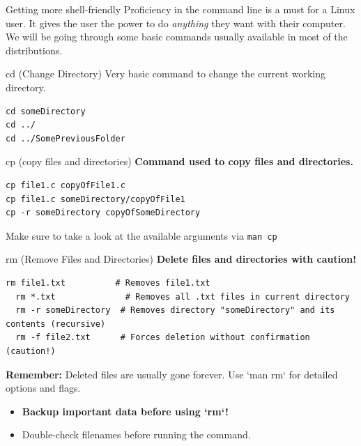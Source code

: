 \documentclass{beamer}
\begin{document}
\begin{frame}{Getting more shell-friendly}
	Proficiency in the command line is a must for a Linux user. It gives the user the power to do \textit{anything} they want with their computer.
	We will be going through some basic commands usually available in most of the distributions.
\end{frame}

\begin{frame}[fragile]{cd (Change Directory)}
	Very basic command to change the current working directory.
\begin{lstlisting}
cd someDirectory
cd ../
cd ../SomePreviousFolder
\end{lstlisting}
\end{frame}

\begin{frame}[fragile]{cp (copy files and directories)}
	\textbf{Command used to copy files and directories.}
\begin{lstlisting}
cp file1.c copyOfFile1.c
cp file1.c someDirectory/copyOfFile1
cp -r someDirectory copyOfSomeDirectory
\end{lstlisting}
\par{Make sure to take a look at the available arguments via \lstinline{man cp}}
\end{frame}

\begin{frame}[fragile]{rm (Remove Files and Directories)}
  \textbf{Delete files and directories with caution!}

    \begin{lstlisting}[frame=none]
  rm file1.txt          # Removes file1.txt
  rm *.txt              # Removes all .txt files in current directory
  rm -r someDirectory  # Removes directory "someDirectory" and its contents (recursive)
  rm -f file2.txt      # Forces deletion without confirmation (caution!)
  \end{lstlisting}

  \textbf{Remember:} Deleted files are usually gone forever. Use `man rm` for detailed options and flags.

  \begin{itemize}
    \item \textbf{Backup important data before using `rm`!}
    \item Double-check filenames before running the command.
  \end{itemize}
\end{frame}
\end{document}
